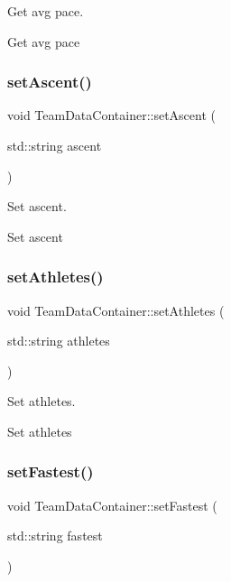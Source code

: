 Get avg pace. 

Get avg pace \mbox{\label{classTeamDataContainer_af402d96fc75382c8940789ec5d7bbc0d}} 
\subsubsection{\texorpdfstring{setAscent()}{setAscent()}}
{\footnotesize\ttfamily void Team\+Data\+Container\+::set\+Ascent (\begin{DoxyParamCaption}\item[{std\+::string}]{ascent }\end{DoxyParamCaption})}



Set ascent. 

Set ascent \mbox{\label{classTeamDataContainer_a1f2285027f3d693a2922f43276960e47}} 
\subsubsection{\texorpdfstring{setAthletes()}{setAthletes()}}
{\footnotesize\ttfamily void Team\+Data\+Container\+::set\+Athletes (\begin{DoxyParamCaption}\item[{std\+::string}]{athletes }\end{DoxyParamCaption})}



Set athletes. 

Set athletes \mbox{\label{classTeamDataContainer_ae572464dfbc81211c04997069b39e526}} 
\subsubsection{\texorpdfstring{setFastest()}{setFastest()}}
{\footnotesize\ttfamily void Team\+Data\+Container\+::set\+Fastest (\begin{DoxyParamCaption}\item[{std\+::string}]{fastest }\end{DoxyParamCaption})}



